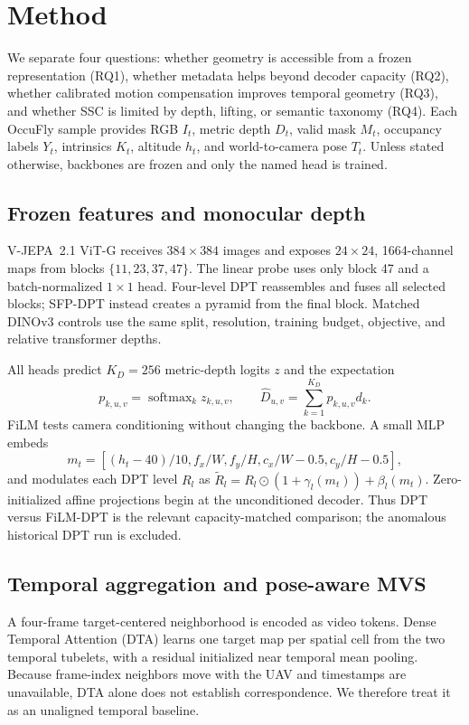 \section{Method}
\label{sec:method}

We separate four questions: whether geometry is accessible from a frozen representation (RQ1), whether metadata helps beyond decoder capacity (RQ2), whether calibrated motion compensation improves temporal geometry (RQ3), and whether SSC is limited by depth, lifting, or semantic taxonomy (RQ4). Each OccuFly sample provides RGB $I_t$, metric depth $D_t$, valid mask $M_t$, occupancy labels $Y_t$, intrinsics $K_t$, altitude $h_t$, and world-to-camera pose $T_t$. Unless stated otherwise, backbones are frozen and only the named head is trained.

\subsection{Frozen features and monocular depth}
V-JEPA~2.1 ViT-G receives $384\times384$ images and exposes $24\times24$, 1664-channel maps from blocks $\{11,23,37,47\}$. The linear probe uses only block 47 and a batch-normalized $1\times1$ head. Four-level DPT reassembles and fuses all selected blocks; SFP-DPT instead creates a pyramid from the final block. Matched DINOv3 controls use the same split, resolution, training budget, objective, and relative transformer depths.

All heads predict $K_D=256$ metric-depth logits $z$ and the expectation
\begin{equation}
 p_{k,u,v}=\operatorname{softmax}_k z_{k,u,v},\qquad
 \hat D_{u,v}=\sum_{k=1}^{K_D}p_{k,u,v}d_k .
 \label{eq:depth_estimate}
\end{equation}
FiLM tests camera conditioning without changing the backbone. A small MLP embeds
\begin{equation}
 m_t=[(h_t-40)/10, f_x/W,f_y/H,c_x/W-0.5,c_y/H-0.5],
\end{equation}
and modulates each DPT level $R_l$ as $\widetilde R_l=R_l\odot(1+\gamma_l(m_t))+\beta_l(m_t)$. Zero-initialized affine projections begin at the unconditioned decoder. Thus DPT versus FiLM-DPT is the relevant capacity-matched comparison; the anomalous historical DPT run is excluded.

\subsection{Temporal aggregation and pose-aware MVS}
A four-frame target-centered neighborhood is encoded as video tokens. Dense Temporal Attention (DTA) learns one target map per spatial cell from the two temporal tubelets, with a residual initialized near temporal mean pooling. Because frame-index neighbors move with the UAV and timestamps are unavailable, DTA alone does not establish correspondence. We therefore treat it as an unaligned temporal baseline.

